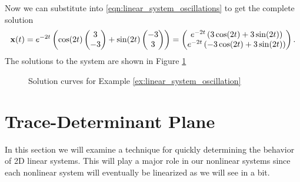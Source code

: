 \begin{example}
    Now we can substitute into \eqref{eqn:linear_system_oscillations} to get the complete
    solution
    \[ {\bf x}(t) = e^{-2t} \left( \cos(2t) \begin{pmatrix} 3 \\ -3 \end{pmatrix} + \sin(2t)
    \begin{pmatrix} -3 \\ 3 \end{pmatrix} \right) = \begin{pmatrix} e^{-2t} \left( 3
        \cos(2t) + 3 \sin(2t)
    \right) \\ e^{-2t} \left( -3\cos(2t) + 3\sin(2t) \right) \end{pmatrix}. \]
    The solutions to the system are shown in Figure \ref{fig:linear_system_oscillation}
\end{example}

\begin{figure}
    \begin{center}
    \end{center}
    \caption{Solution curves for Example \ref{ex:linear_system_oscillation}}
    \label{fig:linear_system_oscillation}
\end{figure}




\newpage\section{Trace-Determinant Plane}
In this section we will examine a technique for quickly determining
the behavior of 2D linear systems.  This will play a major role in our nonlinear systems
since each nonlinear system will eventually be linearized as we will see in a bit.  


